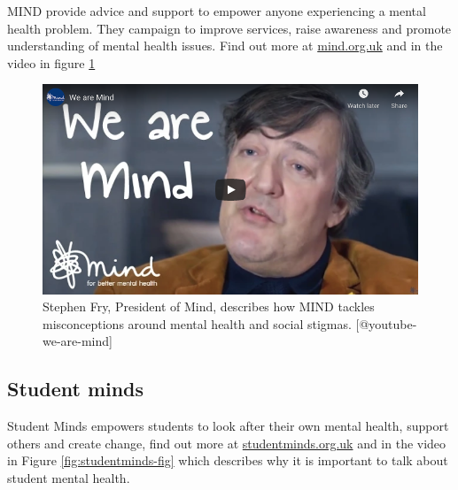 \documentclass[
]{book}
\begin{document}
MIND provide advice and support to empower anyone experiencing a mental health problem. They campaign to improve services, raise awareness and promote understanding of mental health issues. Find out more at \href{https://www.mind.org.uk}{mind.org.uk} and in the video in figure \ref{fig:stephenfry-fig}

\begin{figure}

{\centering \includegraphics[width=0.99\linewidth]{images/youtube-we-are-mind} 

}

\caption{Stephen Fry, President of Mind, describes how MIND tackles misconceptions around mental health and social stigmas. [@youtube-we-are-mind] }\label{fig:stephenfry-fig}
\end{figure}

\hypertarget{studentminds}{%
\subsection{Student minds}\label{studentminds}}

Student Minds empowers students to look after their own mental health, support others and create change, find out more at \href{https://www.studentminds.org.uk}{studentminds.org.uk} and in the video in Figure \ref{fig:studentminds-fig} which describes why it is important to talk about student mental health.
\end{document}
